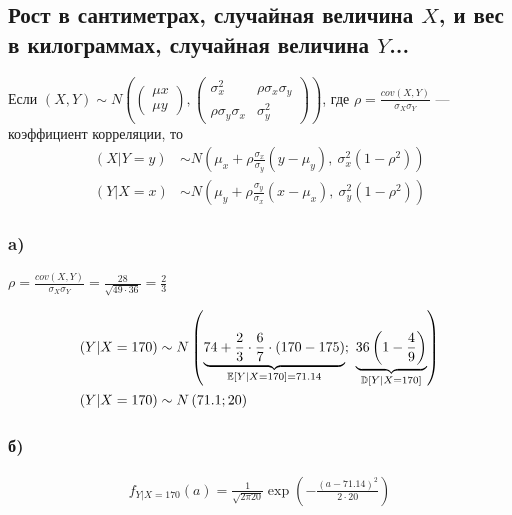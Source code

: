 \documentclass{article}
\begin{document}
\subsection{Рост в сантиметрах, случайная величина $X$, и вес в килограммах, случайная величина $Y$...}
\theorem Если $(X,Y)\sim N\left(\begin{pmatrix}
    \mu x\\
    \mu y
\end{pmatrix}, \begin{pmatrix}
    \sigma_x^2&\rho\sigma_x\sigma_y\\
    \rho\sigma_y\sigma_x&\sigma_y^2
\end{pmatrix}\right)$, где $\rho=\displaystyle\frac{cov(X,Y)}{\sigma_X\sigma_Y}$ — коэффициент корреляции, то 
\begin{equation*}
    \begin{aligned}
        (X|Y=y)&\sim N\left(\mu_x+\rho\frac{\sigma_x}{\sigma_y}(y-\mu_y),\ \sigma_x^2\left(1-\rho^2\right)\right)\\
        (Y|X=x)&\sim N\left(\mu_y+\rho\frac{\sigma_y}{\sigma_x}(x-\mu_x),\ \sigma_y^2\left(1-\rho^2\right)\right)
    \end{aligned}
\end{equation*}

\subsubsection*{a)}
$\rho=\displaystyle\frac{cov(X,Y)}{\sigma_X\sigma_Y}=\frac{28}{\sqrt{49\cdot36}}=\frac{2}{3}$

\begin{equation*}
    \begin{aligned}
        (Y|X=170)&\sim N\left(\underbrace{74+\frac{2}{3}\cdot\frac{6}{7}\cdot(170-175)}_{\mathbb{E}\left[Y|X=170\right]=71.14};\ \underbrace{36\left(1-\frac{4}{9}\right)}_{\mathbb{D}\left[Y|X=170\right]}\right)\\
        (Y|X=170)&\sim N\left(71.1;20\right)
    \end{aligned}
\end{equation*}

\subsubsection*{б)}
\begin{equation*}
    \begin{aligned}
        f_{Y|X=170}(a)=\frac{1}{\sqrt{2\pi20}}\exp\left(-\frac{(a-71.14)^2}{2\cdot20}\right)
    \end{aligned}
\end{equation*}
\end{document}
